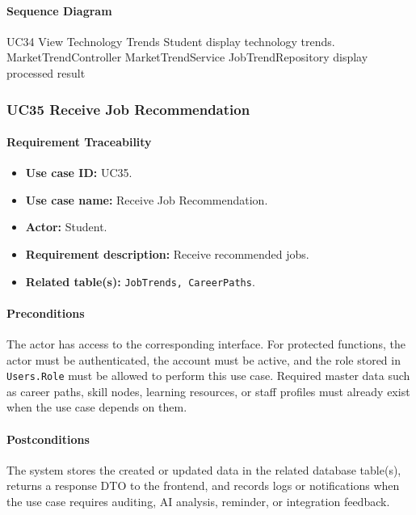 \paragraph{Sequence Diagram}

\SequenceDiagram
{UC34 View Technology Trends}
{Student}
{display technology trends.}
{MarketTrendController}
{MarketTrendService}
{JobTrendRepository}
{display processed result}

\subsubsection{UC35 Receive Job Recommendation}

\paragraph{Requirement Traceability}

\begin{itemize}
    \item \textbf{Use case ID:} UC35.
    \item \textbf{Use case name:} Receive Job Recommendation.
    \item \textbf{Actor:} Student.
    \item \textbf{Requirement description:} Receive recommended jobs.
    \item \textbf{Related table(s):} \texttt{JobTrends, CareerPaths}.
\end{itemize}

\paragraph{Preconditions}

The actor has access to the corresponding interface. For protected functions, the actor must be authenticated, the account must be active, and the role stored in \texttt{Users.Role} must be allowed to perform this use case. Required master data such as career paths, skill nodes, learning resources, or staff profiles must already exist when the use case depends on them.

\paragraph{Postconditions}

The system stores the created or updated data in the related database table(s), returns a response DTO to the frontend, and records logs or notifications when the use case requires auditing, AI analysis, reminder, or integration feedback.

